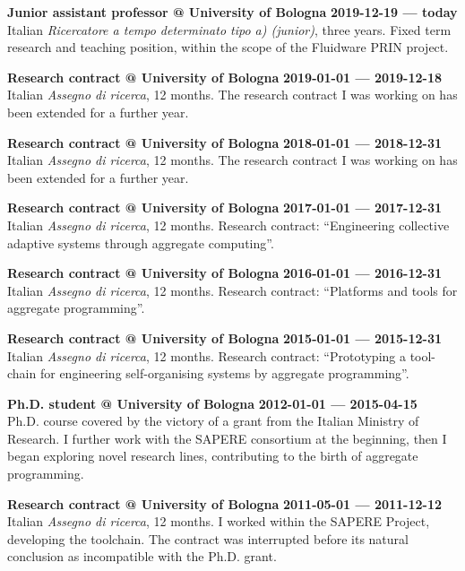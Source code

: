 \textbf{Junior assistant professor @ University of Bologna} \hfill \textbf{2019-12-19 --- today}\\
Italian \emph{Ricercatore a tempo determinato tipo a) (junior)}, three years.
Fixed term research and teaching position,
within the scope of the Fluidware PRIN project.

\halfblankline{}

\textbf{Research contract @ University of Bologna} \hfill \textbf{2019-01-01 --- 2019-12-18}\\
Italian \emph{Assegno di ricerca}, 12 months.
The research contract I was working on has been extended for a further year.

\halfblankline{}

\textbf{Research contract @ University of Bologna} \hfill \textbf{2018-01-01 --- 2018-12-31}\\
Italian \emph{Assegno di ricerca}, 12 months.
The research contract I was working on has been extended for a further year.

\halfblankline{}

\textbf{Research contract @ University of Bologna} \hfill \textbf{2017-01-01 --- 2017-12-31}\\
Italian \emph{Assegno di ricerca}, 12 months.
Research contract: ``Engineering collective adaptive systems through aggregate computing''.

\halfblankline{}

\textbf{Research contract @ University of Bologna} \hfill \textbf{2016-01-01 --- 2016-12-31}\\
Italian \emph{Assegno di ricerca}, 12 months.
Research contract: ``Platforms and tools for aggregate programming''.

\halfblankline{}

\textbf{Research contract @ University of Bologna} \hfill \textbf{2015-01-01 --- 2015-12-31}\\
Italian \emph{Assegno di ricerca}, 12 months.
Research contract: ``Prototyping a tool-chain for engineering self-organising systems by aggregate programming''.

\halfblankline{}

\textbf{Ph.D. student @ University of Bologna} \hfill \textbf{2012-01-01 --- 2015-04-15}\\
Ph.D. course covered by the victory of a grant from the Italian Ministry of Research.
I further work with the SAPERE consortium at the beginning, then I began exploring novel research lines, contributing to the birth of aggregate programming.

\halfblankline{}

\textbf{Research contract @ University of Bologna} \hfill \textbf{2011-05-01 --- 2011-12-12}\\
Italian \emph{Assegno di ricerca}, 12 months.
I worked within the SAPERE Project, developing the toolchain.
The contract was interrupted before its natural conclusion as incompatible with the Ph.D. grant.
